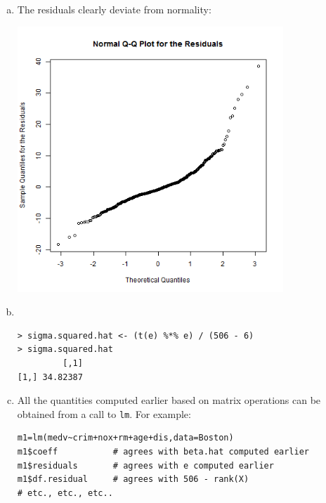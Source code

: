 \documentclass[paper=a4, fontsize=11pt]{scrartcl} %
\begin{document}
\begin{enumerate}[(a)]
\pagebreak
\item The residuals clearly deviate from normality:
 \begin{center}
\includegraphics[width=10cm, height=10cm, width= 10cm]{normplot_e}
\end{center} 
\item   \ 

\begin{lstlisting}[basicstyle=\ttfamily\small\bfseries]
> sigma.squared.hat <- (t(e) %*% e) / (506 - 6)
> sigma.squared.hat
         [,1]
[1,] 34.82387
\end{lstlisting}

\item All the quantities computed earlier based on matrix operations can be obtained from a call to 
\texttt{lm}. For example:
\begin{lstlisting}[basicstyle=\ttfamily\small\bfseries]
m1=lm(medv~crim+nox+rm+age+dis,data=Boston)
m1$coeff           # agrees with beta.hat computed earlier
m1$residuals       # agrees with e computed earlier
m1$df.residual     # agrees with 506 - rank(X)
# etc., etc., etc..
\end{lstlisting}

\end{enumerate}
\end{document}
